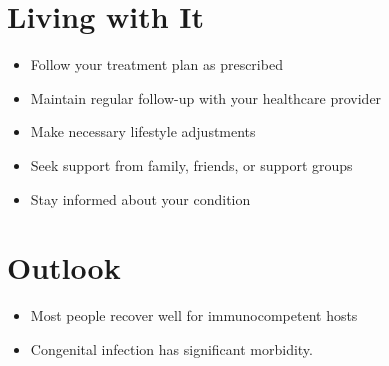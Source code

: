 \section{Living with It}
\begin{itemize}[noitemsep]
  \item Follow your treatment plan as prescribed
  \item Maintain regular follow-up with your healthcare provider
  \item Make necessary lifestyle adjustments
  \item Seek support from family, friends, or support groups
  \item Stay informed about your condition
\end{itemize}
\section{Outlook}
\begin{itemize}[noitemsep]
  \item Most people recover well for immunocompetent hosts
  \item Congenital infection has significant morbidity.
\end{itemize}
